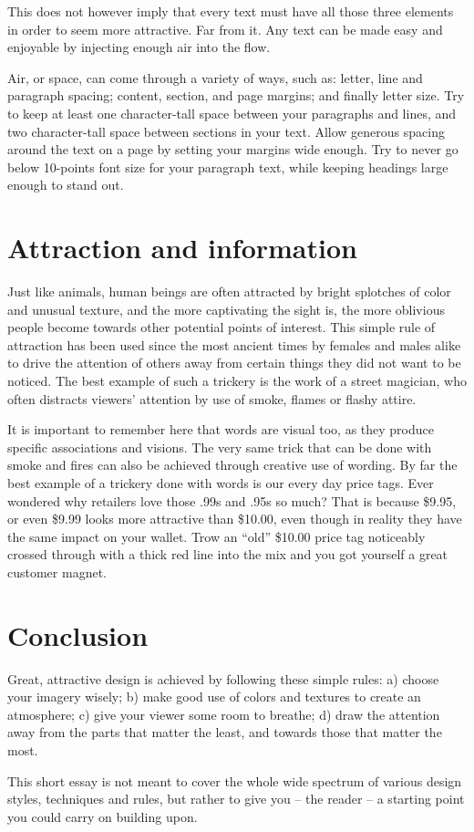 This does not however imply that every text must have all those three elements in
order to seem more attractive. Far from it. Any text can be made easy and
enjoyable by injecting enough air into the flow.

Air, or space, can come through a variety of ways, such as: letter, line and
paragraph spacing; content, section, and page margins; and finally letter size. Try
to keep at least one character-tall space between your paragraphs and lines, and
two character-tall space between sections in your text. Allow generous spacing
around the text on a page by setting your margins wide enough. Try to never go
below 10-points font size for your paragraph text, while keeping headings large
enough to stand out.

\section*{Attraction and information}

Just like animals, human beings are often attracted by bright splotches of color
and unusual texture, and the more captivating the sight is, the more oblivious
people become towards other potential points of interest. This simple rule of
attraction has been used since the most ancient times by females and males
alike to drive the attention of others away from certain things they did not want
to be noticed. The best example of such a trickery is the work of a street
magician, who often distracts viewers’ attention by use of smoke, flames or
flashy attire.

It is important to remember here that words are visual too, as they produce
specific associations and visions. The very same trick that can be done with
smoke and fires can also be achieved through creative use of wording. By far the
best example of a trickery done with words is our every day price tags. Ever
wondered why retailers love those .99s and .95s so much? That is because \$9.95, or
even \$9.99 looks more attractive than \$10.00, even though in reality they
have the same impact on your wallet. Trow an ``old'' \$10.00 price tag noticeably
crossed through with a thick red line into the mix and you got yourself a great
customer magnet.

\section*{Conclusion}

Great, attractive design is achieved by following these simple rules: a) choose
your imagery wisely; b) make good use of colors and textures to create an
atmosphere; c) give your viewer some room to breathe; d) draw the attention
away from the parts that matter the least, and towards those that matter the
most.

This short essay is not meant to cover the whole wide spectrum of various design
styles, techniques and rules, but rather to give you -- the reader -- a starting
point you could carry on building upon.
